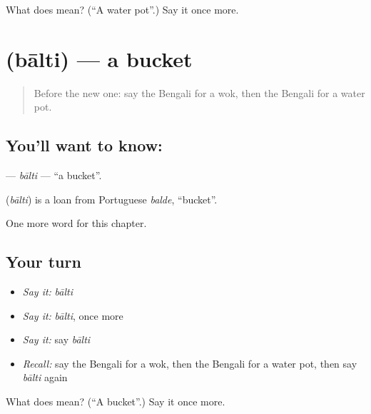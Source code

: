 \begin{tcolorbox}[breakable,colback=teal!4,colframe=teal!35!black,title={Before you move on}]
What does  mean? (\textquotedblleft{}A water pot\textquotedblright{}.) Say it once more.
\end{tcolorbox}
\section[\texorpdfstring{\bn{বালতি} (bālti)}{বালতি (bālti)}]{ (bālti) — a bucket}

\label{lesson:BN-C107-balti}



\begin{quote}
Before the new one: say the Bengali for a wok, then the Bengali for a water pot.
\end{quote}

\subsection*{You'll want to know: }
\textbf{} — \emph{bālti} — \textquotedblleft{}a bucket\textquotedblright{}.

\begin{cousinweb}
\textbf{} (\emph{bālti}) is a loan from Portuguese \emph{balde}, \textquotedblleft{}bucket\textquotedblright{}.
\end{cousinweb}

\begin{grammarlens}[title={What you've built}]
One more word for this chapter.
\end{grammarlens}

\subsection*{Your turn}
\begin{itemize}
\raggedright
  \item \emph{Say it:} \emph{bālti}
  \item \emph{Say it:} \emph{bālti}, once more
  \item \emph{Say it:} say \emph{bālti}
  \item \emph{Recall:} say the Bengali for a wok, then the Bengali for a water pot, then say \emph{bālti} again
\end{itemize}

\begin{tcolorbox}[breakable,colback=teal!4,colframe=teal!35!black,title={Before you move on}]
What does  mean? (\textquotedblleft{}A bucket\textquotedblright{}.) Say it once more.
\end{tcolorbox}
